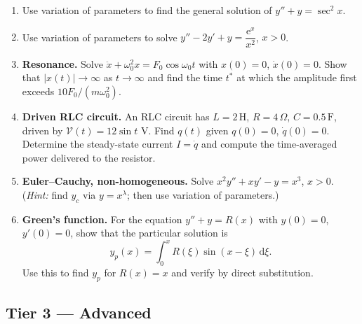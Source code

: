 \documentclass[12pt,a4paper]{article}
\newcommand{\ee}{\mathrm{e}}
\newcommand{\dd}{\mathrm{d}}
\begin{document}
\begin{enumerate}[label=\textbf{\arabic*.}, leftmargin=*, start=6]

\item Use variation of parameters to find the general solution of $y'' + y = \sec^2 x$.

\item Use variation of parameters to solve $y'' - 2y' + y = \dfrac{\ee^x}{x^2}$, $x > 0$.

\item \textbf{Resonance.} Solve $\ddot x + \omega_0^2 x = F_0\cos\omega_0 t$ with
  $x(0) = 0$, $\dot x(0) = 0$. Show that $|x(t)| \to \infty$ as $t\to\infty$ and
  find the time $t^*$ at which the amplitude first exceeds $10 F_0/(m\omega_0^2)$.

\item \textbf{Driven RLC circuit.} An RLC circuit has $L=2\,\mathrm{H}$,
  $R=4\,\Omega$, $C=0.5\,\mathrm{F}$, driven by $\mathcal{V}(t)=12\sin t$ V.
  Find $q(t)$ given $q(0)=0$, $\dot q(0)=0$. Determine the steady-state current
  $I = \dot q$ and compute the time-averaged power delivered to the resistor.

\item \textbf{Euler--Cauchy, non-homogeneous.} Solve
  $x^2 y'' + xy' - y = x^3$, $x>0$.
  (\textit{Hint:} find $y_c$ via $y=x^\lambda$; then use variation of parameters.)

\item \textbf{Green's function.} For the equation $y'' + y = R(x)$ with
  $y(0)=0$, $y'(0)=0$, show that the particular solution is
  \[
    y_p(x) = \int_0^x R(\xi)\sin(x-\xi)\,\dd\xi.
  \]
  Use this to find $y_p$ for $R(x) = x$ and verify by direct substitution.

\end{enumerate}

\subsection*{Tier 3 --- Advanced}
\end{document}
